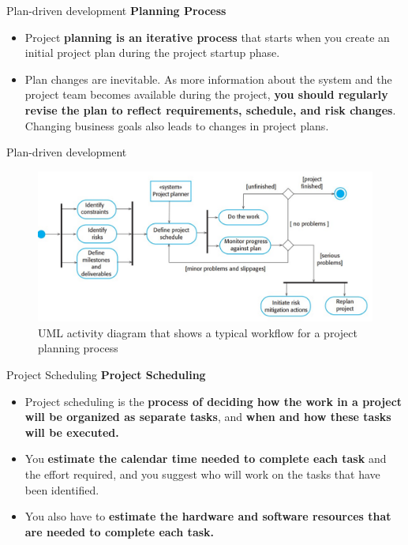 \documentclass{beamer}
\begin{document}
\begin{frame}{Plan-driven development}
	\textbf{Planning Process}
	\begin{itemize}
		\item Project \textbf{planning is an iterative process} that starts when you create an initial project plan during the project startup phase.
		\item Plan changes are inevitable. As more information about the system and the project team becomes available during the project,\textbf{ you should regularly revise the plan to reflect requirements, schedule, and risk changes}. Changing business goals also leads to changes in project plans. 
	\end{itemize}
\end{frame}
\begin{frame}{Plan-driven development}
	\begin{figure}
	\includegraphics[scale=.5]{img/m4_5}
	\caption{UML activity diagram that shows a typical workflow for a project planning process
	}
\end{figure}
\end{frame}
\begin{frame}{Project Scheduling}
\textbf{Project Scheduling}
\begin{itemize}
	\item Project scheduling is the \textbf{process of deciding how the work in a project will be organized as separate 
		tasks}, and \textbf{when and how these tasks will be executed.}
	\item You\textbf{ estimate the calendar time needed to complete each task} and the effort required, and you suggest 
	who will work on the tasks that have been identified.
	\item You also have to \textbf{estimate the hardware and software resources that are needed to complete each 
		task.}
\end{itemize}
\end{frame}
\end{document}

